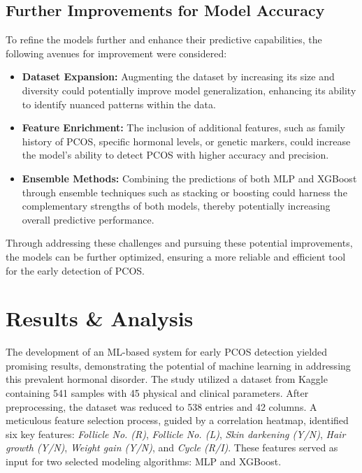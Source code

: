 \documentclass{article}
\begin{document}
\subsection{Further Improvements for Model Accuracy}

To refine the models further and enhance their predictive capabilities, the following avenues for improvement were considered:

\begin{itemize}
    \item \textbf{Dataset Expansion:} Augmenting the dataset by increasing its size and diversity could potentially improve model generalization, enhancing its ability to identify nuanced patterns within the data.
    \item \textbf{Feature Enrichment:} The inclusion of additional features, such as family history of PCOS, specific hormonal levels, or genetic markers, could increase the model's ability to detect PCOS with higher accuracy and precision.
    \item \textbf{Ensemble Methods:} Combining the predictions of both MLP and XGBoost through ensemble techniques such as stacking or boosting could harness the complementary strengths of both models, thereby potentially increasing overall predictive performance.
\end{itemize}

Through addressing these challenges and pursuing these potential improvements, the models can be further optimized, ensuring a more reliable and efficient tool for the early detection of PCOS.


\section*{Results \& Analysis}

The development of an ML-based system for early PCOS detection yielded promising results, demonstrating the potential of machine learning in addressing this prevalent hormonal disorder. The study utilized a dataset from Kaggle containing 541 samples with 45 physical and clinical parameters. After preprocessing, the dataset was reduced to 538 entries and 42 columns. A meticulous feature selection process, guided by a correlation heatmap, identified six key features: \textit{Follicle No. (R)}, \textit{Follicle No. (L)}, \textit{Skin darkening (Y/N)}, \textit{Hair growth (Y/N)}, \textit{Weight gain (Y/N)}, and \textit{Cycle (R/I)}. These features served as input for two selected modeling algorithms: MLP and XGBoost.
\end{document}
